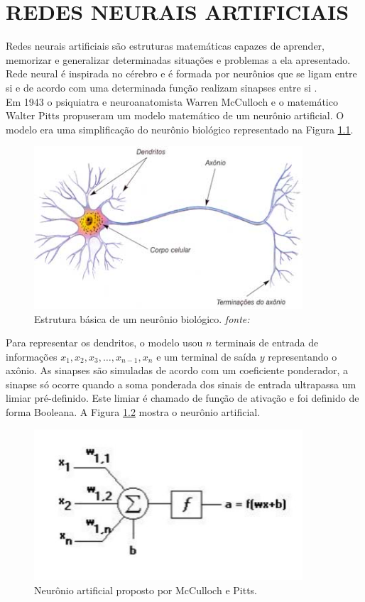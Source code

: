 \chapter{REDES NEURAIS ARTIFICIAIS}
\label{chap:ann}
\quad Redes neurais artificiais são estruturas matemáticas capazes de aprender, memorizar e generalizar determinadas situações e problemas a ela apresentado. Rede neural é inspirada no cérebro e é formada por neurônios que se ligam entre si e de acordo com uma determinada função realizam sinapses entre si \cite{hay}.\\

Em 1943 o psiquiatra e neuroanatomista Warren McCulloch e o matemático Walter Pitts propuseram um modelo matemático de um neurônio artificial. O modelo era uma simplificação do neurônio biológico representado na Figura \ref{fig:neur}. 

\begin{figure}[H]
\centering %
\includegraphics[width=10cm]{img/neuronio.jpg} %
\caption{Estrutura básica de um neurônio biológico. \textit{fonte:\cite{barroso}}}
\label{fig:neur}
\end{figure}

Para representar os dendritos, o modelo usou $n$ terminais de entrada de informações $x_1, x_2, x_3, \dots, x_{n-1}, x_n$ e um terminal de saída $y$ representando o axônio. As sinapses são  simuladas de acordo com um coeficiente ponderador, a sinapse só ocorre quando a soma ponderada dos sinais de entrada ultrapassa um limiar pré-definido. Este limiar é chamado de função de ativação e foi definido de forma Booleana. A Figura \ref{fig:ann} mostra o neurônio artificial.

\begin{figure}[H]
\centering %
\includegraphics[width=10cm]{img/neura.jpg} %
\caption{Neurônio artificial proposto por McCulloch e Pitts. \textit{\cite{fia}} }
\label{fig:ann}
\end{figure}

